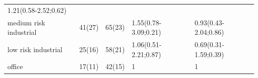 \begin{longtable}[]{@{}lllll@{}}
\begin{minipage}[t]{0.23\columnwidth}
1.21(0.58-2.52;0.62)\strut
\end{minipage}\tabularnewline
\begin{minipage}[t]{0.20\columnwidth}\raggedright
medium risk industrial\strut
\end{minipage} & \begin{minipage}[t]{0.08\columnwidth}\raggedright
41(27)\strut
\end{minipage} & \begin{minipage}[t]{0.10\columnwidth}\raggedright
65(23)\strut
\end{minipage} & \begin{minipage}[t]{0.24\columnwidth}\raggedright
1.55(0.78-3.09;0.21)\strut
\end{minipage} & \begin{minipage}[t]{0.23\columnwidth}\raggedright
0.93(0.43-2.04;0.86)\strut
\end{minipage}\tabularnewline
\begin{minipage}[t]{0.20\columnwidth}\raggedright
low risk industrial\strut
\end{minipage} & \begin{minipage}[t]{0.08\columnwidth}\raggedright
25(16)\strut
\end{minipage} & \begin{minipage}[t]{0.10\columnwidth}\raggedright
58(21)\strut
\end{minipage} & \begin{minipage}[t]{0.24\columnwidth}\raggedright
1.06(0.51-2.21;0.87)\strut
\end{minipage} & \begin{minipage}[t]{0.23\columnwidth}\raggedright
0.69(0.31-1.59;0.39)\strut
\end{minipage}\tabularnewline
\begin{minipage}[t]{0.20\columnwidth}\raggedright
office\strut
\end{minipage} & \begin{minipage}[t]{0.08\columnwidth}\raggedright
17(11)\strut
\end{minipage} & \begin{minipage}[t]{0.10\columnwidth}\raggedright
42(15)\strut
\end{minipage} & \begin{minipage}[t]{0.24\columnwidth}\raggedright
1\strut
\end{minipage} & \begin{minipage}[t]{0.23\columnwidth}\raggedright
1\strut
\end{minipage}\tabularnewline
\bottomrule
\end{longtable}

